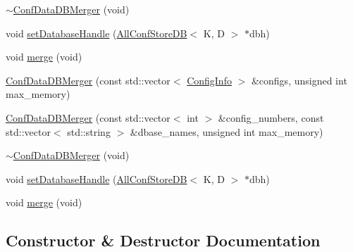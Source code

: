 \begin{DoxyCompactItemize}
\mbox{\hyperlink{classFILEDB_1_1ConfDataDBMerger_a1592d55d089ad7ead813ab8d2b955e09}{$\sim$\+Conf\+Data\+D\+B\+Merger}} (void)
\item 
void \mbox{\hyperlink{classFILEDB_1_1ConfDataDBMerger_aba7a50569bcdc1beca3b82536fa5922b}{set\+Database\+Handle}} (\mbox{\hyperlink{classFILEDB_1_1AllConfStoreDB}{All\+Conf\+Store\+DB}}$<$ K, D $>$ $\ast$dbh)
\item 
void \mbox{\hyperlink{classFILEDB_1_1ConfDataDBMerger_a6738f9880645518ba94eccd3b2037f24}{merge}} (void)
\item 
\mbox{\hyperlink{classFILEDB_1_1ConfDataDBMerger_a2d22aeb10cb29cd9acb42cbd042c74d3}{Conf\+Data\+D\+B\+Merger}} (const std\+::vector$<$ \mbox{\hyperlink{classFILEDB_1_1ConfigInfo}{Config\+Info}} $>$ \&configs, unsigned int max\+\_\+memory)
\item 
\mbox{\hyperlink{classFILEDB_1_1ConfDataDBMerger_a495cdfd447f2ed64776d87601c36a05b}{Conf\+Data\+D\+B\+Merger}} (const std\+::vector$<$ int $>$ \&config\+\_\+numbers, const std\+::vector$<$ std\+::string $>$ \&dbase\+\_\+names, unsigned int max\+\_\+memory)
\item 
\mbox{\hyperlink{classFILEDB_1_1ConfDataDBMerger_a1592d55d089ad7ead813ab8d2b955e09}{$\sim$\+Conf\+Data\+D\+B\+Merger}} (void)
\item 
void \mbox{\hyperlink{classFILEDB_1_1ConfDataDBMerger_aba7a50569bcdc1beca3b82536fa5922b}{set\+Database\+Handle}} (\mbox{\hyperlink{classFILEDB_1_1AllConfStoreDB}{All\+Conf\+Store\+DB}}$<$ K, D $>$ $\ast$dbh)
\item 
void \mbox{\hyperlink{classFILEDB_1_1ConfDataDBMerger_a6738f9880645518ba94eccd3b2037f24}{merge}} (void)
\end{DoxyCompactItemize}


\subsection{Constructor \& Destructor Documentation}
\mbox{\label{classFILEDB_1_1ConfDataDBMerger_a2d22aeb10cb29cd9acb42cbd042c74d3}} 
